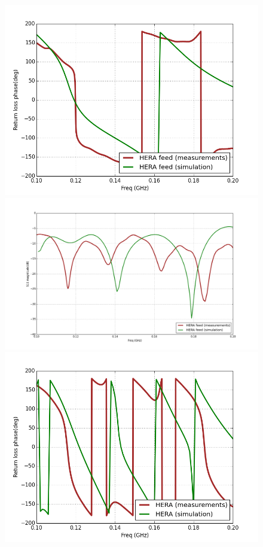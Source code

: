 \documentclass[twocolumn]{emulateapj}
\begin{document}
\begin{figure}[ht]
\begin{minipage}[b]{0.5\linewidth}
\centering
\includegraphics[angle=0, width=\linewidth]{GB_reflectometry_part3/plot/RL_ph_feed.png}
\end{minipage}
\vspace{0.1cm}  
\begin{minipage}[b]{0.5\linewidth}
\centering
\includegraphics[angle=0, width=\linewidth]{GB_reflectometry_part3/plot/RL_mag_dish.png}
\end{minipage}
\hspace{0.1cm}
\begin{minipage}[b]{0.5\linewidth}
\centering
\includegraphics[angle=0, width=\linewidth]{GB_reflectometry_part3/plot/RL_ph_HERA.png}

\end{minipage}
\end{figure}
\end{document}
